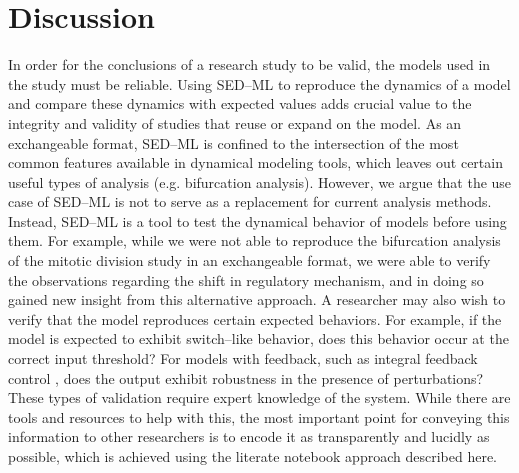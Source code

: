 \documentclass[10pt,letterpaper]{article}
\begin{document}
\section*{Discussion}

In order for the conclusions of a research study to be valid, the models used in the study must be reliable. Using SED--ML to reproduce the dynamics of a model and compare these dynamics with expected values adds crucial value to the integrity and validity of studies that reuse or expand on the model. As an exchangeable format, SED--ML is confined to the intersection of the most common features available in dynamical modeling tools, which leaves out certain useful types of analysis (e.g. bifurcation analysis). However, we argue that the use case of SED--ML is not to serve as a replacement for current analysis methods. Instead, SED--ML is a tool to test the dynamical behavior of models before using them. For example, while we were not able to reproduce the bifurcation analysis of the mitotic division study \cite{calzone2007dynamical} in an exchangeable format, we were able to verify the observations regarding the shift in regulatory mechanism, and in doing so gained new insight from this alternative approach.
A researcher may also wish to verify that the model reproduces certain expected behaviors. For example, if the model is expected to exhibit switch--like behavior, does this behavior occur at the correct input threshold? For models with feedback, such as integral feedback control \cite{briat2016antithetic}, does the output exhibit robustness in the presence of perturbations? These types of validation require expert knowledge of the system. While there are tools and resources to help with this, the most important point for conveying this information to other researchers is to encode it as transparently and lucidly as possible, which is achieved using the literate notebook approach described here.
\end{document}
